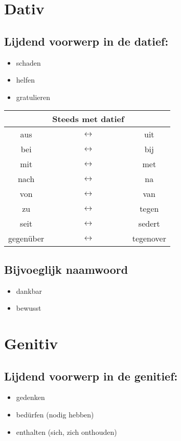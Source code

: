 \documentclass[main.tex]{subfiles}
\begin{document}
\section{Dativ}
\subsection{Lijdend voorwerp in de datief:}
\begin{itemize}
\item schaden
\item helfen
\item gratulieren
\end{itemize}

\begin{tabular}{ccc}
 & Steeds met datief &  \\ 
\hline
aus & $\leftrightarrow$ & uit \\ 
bei & $\leftrightarrow$ & bij \\ 
mit & $\leftrightarrow$ & met \\ 
nach & $\leftrightarrow$ & na \\ 
von & $\leftrightarrow$ & van \\ 
zu & $\leftrightarrow$ & tegen \\ 
seit & $\leftrightarrow$ & sedert \\ 
gegenüber & $\leftrightarrow$ & tegenover \\ 
\end{tabular} 

\subsection{Bijvoeglijk naamwoord}

\begin{itemize}
\item dankbar
\item bewusst
\end{itemize}

\section{Genitiv}
\subsection{Lijdend voorwerp in de genitief:}
\begin{itemize}
\item gedenken
\item bedürfen (nodig hebben)
\item enthalten (sich, zich onthouden)
\end{itemize}
\end{document}
